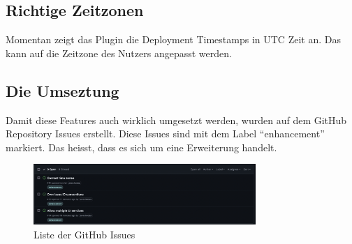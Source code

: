 \subsection{Richtige Zeitzonen}
Momentan zeigt das Plugin die Deployment Timestamps in UTC Zeit an. Das kann auf die Zeitzone des Nutzers
angepasst werden.
\subsection{Die Umseztung}
Damit diese Features auch wirklich umgesetzt werden, wurden auf dem GitHub Repository Issues erstellt. Diese
Issues sind mit dem Label \enquote{enhancement} markiert. Das heisst, dass es sich um eine Erweiterung handelt.
\begin{figure}[H]
    \centering
    \includegraphics[width=0.75\textwidth]{images/misc/issues.png}
    \caption[Ein Screenshot von den aufgelisteten GitHub Issues]{Liste der GitHub Issues}
    \label{fig:issues}
\end{figure}
